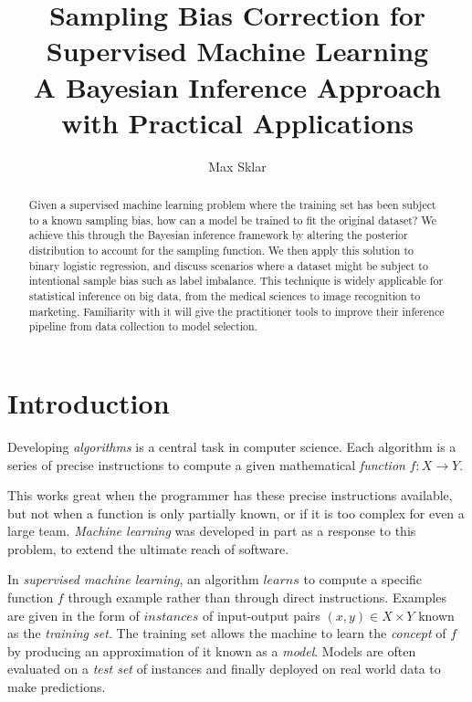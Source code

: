 \documentclass[twoside]{article}
\begin{document}
\parindent=0in
\parskip=12pt


\title{
  Sampling Bias Correction for Supervised Machine Learning \\
  \large{
    A Bayesian Inference Approach with Practical Applications
  }
}

\author{Max Sklar}

\maketitle
\thispagestyle{empty}

\begin{abstract}
Given a supervised machine learning problem where the training set has been subject to a known sampling bias, how can a model be trained to fit the original dataset? We achieve this through the Bayesian inference framework by altering the posterior distribution to account for the sampling function. We then apply this solution to binary logistic regression, and discuss scenarios where a dataset might be subject to intentional sample bias such as label imbalance. This technique is widely applicable for statistical inference on big data, from the medical sciences to image recognition to marketing. Familiarity with it will give the practitioner tools to improve their inference pipeline from data collection to model selection. 
\end{abstract}

\section{Introduction}
\label{section:introduction}

Developing \textit{algorithms} is a central task in computer science. Each algorithm is a series of precise instructions to compute a given mathematical \textit{function} \(f: X \to Y\).

This works great when the programmer has these precise instructions available, but not when a function is only partially known, or if it is too complex for even a large team. \textit{Machine learning} was developed in part as a response to this problem, to extend the ultimate reach of software. 

In \textit{supervised machine learning}, an algorithm \(learns\) to compute a specific function \(f\) through example rather than through direct instructions. Examples are given in the form of \(instances\) of input-output pairs \((x, y) \in X \times Y\) known as the \textit{training set}. The training set allows the machine to learn the \textit{concept} of \(f\) by producing an approximation of it known as a \textit{model}. Models are often evaluated on a \textit{test set} of instances and finally deployed on real world data to make predictions.
\end{document}
